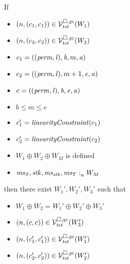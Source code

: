 \begin{lemma}
  \label{lem:splitting-safety-normal}
  If
  \begin{itemize}
  \item $\left(n,(c_1,c_1)\right) \in \mathcal{V}^{\square,\mathit{gc}}_{\mathit{tst}}(W_1)$
  \item $\left(n,(c_2,c_2)\right) \in \mathcal{V}^{\square,\mathit{gc}}_{\mathit{tst}}(W_2)$
  \item $c_1 = ((\mathit{perm},\mathit{l}),\mathit{b},m,\mathit{a})$
  \item $c_2 = ((\mathit{perm},\mathit{l}),m+1,\mathit{e},\mathit{a})$
  \item $c = ((\mathit{perm},\mathit{l}),\mathit{b},\mathit{e},\mathit{a})$
  \item $b \le m \le e$
  \item $c_1' = \linCons{c_1}$
  \item $c_2' = \linCons{c_2}$
  \item $W_1\oplus W_2 \oplus W_M$ is defined
  \item $\mathit{ms}_S,\mathit{stk},\mathit{ms}_{\mathit{stk}},\mathit{ms}_T :_{n}^{}W_M$
  \end{itemize}
  then there exist $W_1',W_2',W_3'$ such that
  \begin{itemize}
  \item $W_1 \oplus W_2 = W_1' \oplus W_2' \oplus W_3'$
  \item $\left(n,(c,c)\right) \in \mathcal{V}^{\square,\mathit{gc}}_{\mathit{tst}}(W_3')$
  \item $\left(n,(c_1',c_1')\right) \in \mathcal{V}^{\square,\mathit{gc}}_{\mathit{tst}}(W_1')$
  \item $\left(n,(c_2',c_2')\right) \in \mathcal{V}^{\square,\mathit{gc}}_{\mathit{tst}}(W_2')$
  \end{itemize}
\end{lemma}
